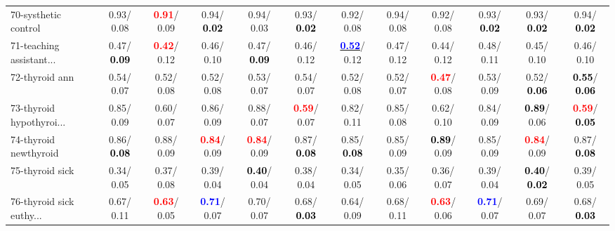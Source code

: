 \begin{table}[h]
\begin{center}
{\begin{tabular}{lc|c|c|c|c|c|c|c|c|c|c}
70-systhetic control &   0.93/  0.08 & \textcolor{red}{\textbf{  0.91}}/  0.09 &   0.94/\textcolor{black}{\textbf{  0.02}} &   0.94/  0.03 &   0.93/\textcolor{black}{\textbf{  0.02}} &   0.92/  0.08 &   0.94/  0.08 &   0.92/  0.08 &   0.93/\textcolor{black}{\textbf{  0.02}} &   0.93/\textcolor{black}{\textbf{  0.02}} &   0.94/\textcolor{black}{\textbf{  0.02}} \\
71-teaching assistant... &   0.47/\textcolor{black}{\textbf{  0.09}} & \textcolor{red}{\textbf{  0.42}}/  0.12 &   0.46/  0.10 &   0.47/\textcolor{black}{\textbf{  0.09}} &   0.46/  0.12 & \underline{\textcolor{blue}{\textbf{  0.52}}}/  0.12 &   0.47/  0.12 &   0.44/  0.12 &   0.48/  0.11 &   0.45/  0.10 &   0.46/  0.10 \\ \hline
72-thyroid ann &   0.54/  0.07 &   0.52/  0.08 &   0.52/  0.08 &   0.53/  0.07 &   0.54/  0.07 &   0.52/  0.08 &   0.52/  0.07 & \textcolor{red}{\textbf{  0.47}}/  0.08 &   0.53/  0.09 &   0.52/\textcolor{black}{\textbf{  0.06}} & \textcolor{black}{\textbf{  0.55}}/\textcolor{black}{\textbf{  0.06}} \\
73-thyroid hypothyroi... &   0.85/  0.09 &   0.60/  0.07 &   0.86/  0.09 &   0.88/  0.07 & \textcolor{red}{\textbf{  0.59}}/  0.07 &   0.82/  0.11 &   0.85/  0.08 &   0.62/  0.10 &   0.84/  0.09 & \textcolor{black}{\textbf{  0.89}}/  0.06 & \textcolor{red}{\textbf{  0.59}}/\textcolor{black}{\textbf{  0.05}} \\
74-thyroid newthyroid &   0.86/\textcolor{black}{\textbf{  0.08}} &   0.88/  0.09 & \textcolor{red}{\textbf{  0.84}}/  0.09 & \textcolor{red}{\textbf{  0.84}}/  0.09 &   0.87/\textcolor{black}{\textbf{  0.08}} &   0.85/\textcolor{black}{\textbf{  0.08}} &   0.85/  0.09 & \textcolor{black}{\textbf{  0.89}}/  0.09 &   0.85/  0.09 & \textcolor{red}{\textbf{  0.84}}/  0.09 &   0.87/\textcolor{black}{\textbf{  0.08}} \\
75-thyroid sick &   0.34/  0.05 &   0.37/  0.08 &   0.39/  0.04 & \textcolor{black}{\textbf{  0.40}}/  0.04 &   0.38/  0.04 &   0.34/  0.05 &   0.35/  0.06 &   0.36/  0.07 &   0.39/  0.04 & \textcolor{black}{\textbf{  0.40}}/\textcolor{black}{\textbf{  0.02}} &   0.39/  0.05 \\
76-thyroid sick euthy... &   0.67/  0.11 & \textcolor{red}{\textbf{  0.63}}/  0.05 & \textcolor{blue}{\textbf{  0.71}}/  0.07 &   0.70/  0.07 &   0.68/\textcolor{black}{\textbf{  0.03}} &   0.64/  0.09 &   0.68/  0.11 & \textcolor{red}{\textbf{  0.63}}/  0.06 & \textcolor{blue}{\textbf{  0.71}}/  0.07 &   0.69/  0.07 &   0.68/\textcolor{black}{\textbf{  0.03}} \\

\end{tabular}}
\end{center}
\end{table}
